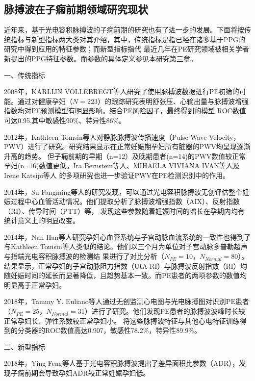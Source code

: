 \subsection{脉搏波在子痫前期领域研究现状}
近年来，基于光电容积脉搏波的子痫前期的研究也有了进一步的发展。下面将按传统指标与新型指标两大类对其介绍，其中，传统指标是指已经在诸多基于PPG的研究中得到应用的特征参数；而新型指标指代
最近几年在PE研究领域被相关学者新提出的PPG特征参数。而参数的具体定义参见本研究第三章。

一、传统指标

2008年，KARLIJN VOLLEBREGT等人\cite{KARLIJN2008}研究了使用脉搏波数据进行PE初筛的可能。通过对健康孕妇（$N=223$）的跟踪研究表明舒张压、心输出量与脉搏波增强指数均对PE预测模型有明显影响。结合PE风险因子，最终得到的模型
ROC数值可达0.95,其中敏感性90\%、特异性86\%。

2012年，Kathleen Tomsin等人\cite{Tomsin2012}对静脉脉搏波传播速度（Pulse Wave Velocity，PWV）进行了研究。研究结果显示在正常妊娠期孕妇所有脏器的PWV均呈现逐渐升高的趋势。
但子痫前期的早期（n=12）及晚期患者(n=14)的PWV数值较正常孕妇(n=16)数值更低。Ira Bernstein等人\cite{Ira2014}、MIHAELA VIVIANA IVAN等人\cite{VivianaIvan2018}及Irene Katsipi等人\cite{Katsipi2014}
的多项研究也进一步验证PWV在PE检测识别中的作用。

2014年，Su Fangming等人\cite{Su2014}的研究发现，可以通过光电容积脉搏波无创评估整个妊娠过程中心血管活动情况。他们提取分析了脉搏波增强指数（AIX）、反射指数（RI）、传导时间（PTT）等，
发现这些参数随着妊娠时间的增长在孕期内均有统计意义上的明显改变。

2014年，Nan Han等人\cite{Han2014}研究孕妇心血管系统与子宫动脉血流系统的一致性也得到了与Kathleen Tomsin等人\cite{Tomsin2012}类似的结论。他们以三个月为单位对子宫动脉多普勒超声与指端光电容积脉搏波的检测结
果进行了对比分析（$N_{PE}=10$，$N_{Normal}=80$）。结果显示，正常孕妇的子宫动脉阻力指数（UtA RI）与脉搏波反射指数（RI）均随妊娠时间的延长而显著降低，且趋势基本一致。而PE患者的两项参数的数值均明显高于正常孕妇。

2018年，Tammy Y. Euliano等人\cite{Euliano2018}通过无创监测心电图与光电脉搏图对识别PE患者（$N_{PE}=25$，$N_{Normal}=31$）进行了研究。他们发现PE患者的脉搏波波峰时长较正常孕妇长、弹性系数较正常孕妇小。
将这些脉搏波特征与其他心电特征训练得到的分类器的ROC数值高达0.907，敏感性78.2\%，特异性89.9\%。

二、新型指标

2018年，Ying Feng等人\cite{Feng2018}基于光电容积脉搏波提出了差异面积比参数（ADR），发现子痫前期会导致孕妇ADR较正常妊娠孕妇低。

